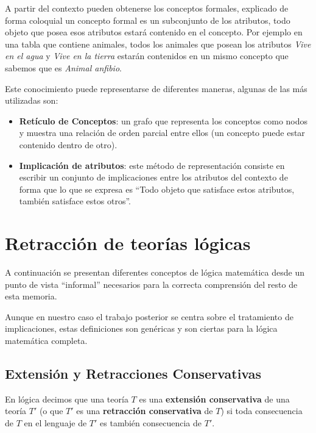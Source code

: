 	A partir del contexto pueden obtenerse los conceptos formales, explicado de forma coloquial un concepto formal es un subconjunto de los atributos, todo objeto que posea esos atributos estará contenido en el concepto. Por ejemplo en una tabla que contiene animales, todos los animales que posean los atributos \textit{Vive en el agua} y \textit{Vive en la tierra} estarán contenidos en un mismo concepto que sabemos que es \textit{Animal anfibio}.
	
	Este conocimiento puede representarse de diferentes maneras, algunas de las más utilizadas son:
	
	\begin{itemize}
		\item  \textbf{Retículo de Conceptos}: un grafo que representa los conceptos como nodos
		y muestra una relación de orden parcial entre ellos (un concepto puede estar contenido dentro de otro).
		
		\item \textbf{Implicación de atributos}: este método de representación consiste en escribir un conjunto de implicaciones entre los atributos del contexto de forma que lo que se expresa es ``Todo objeto que satisface estos atributos, también satisface estos otros''.
	\end{itemize}


\section*{Retracción de teorías lógicas}
	
	A continuación se presentan diferentes conceptos de lógica matemática desde un punto de vista ``informal'' necesarios para 
	la correcta comprensión del resto de esta memoria.
	
	Aunque en nuestro caso el trabajo posterior se centra sobre el tratamiento de implicaciones, estas definiciones son genéricas y 
	son ciertas para la lógica matemática completa.


\subsection*{Extensión y Retracciones Conservativas}
	
	En lógica decimos que una teoría $T$ es una \textbf{extensión conservativa} de una teoría $T'$ (o que $T'$ es una \textbf{retracción conservativa} de $T$) si toda consecuencia de $T$ en el lenguaje de $T'$ es también consecuencia de $T'$.
	
